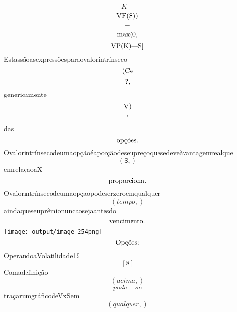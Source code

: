 \documentclass{article}
\begin{document}
\begin{equation}
K—
\end{equation}\begin{equation}
$VF(S))$
\end{equation}\begin{equation}
$=$
\end{equation}\begin{equation}
$max(0,$
\end{equation}\begin{equation}
$VP(K)—S]$
\end{equation}Estassãoasexpressõesparaovalorintrínseco\begin{equation}
$(Ce$
\end{equation}\begin{equation}
$?,$
\end{equation}genericamente\begin{equation}
$V)$
\end{equation}\begin{equation}
$'$
\end{equation}das\begin{equation}
$opções.$
\end{equation}Ovalorintrínsecodeumaopçãoéaporçãodeseupreçoquesedeveàvantagemrealque\begin{equation}
\left( \mathtt{\text{S}},\right)
\end{equation}emrelaçãoaX\begin{equation}
$proporciona.$
\end{equation}Ovalorintrínsecodeumaopçãopodeserzeroemqualquer\begin{equation}
\left( tempo,\right)
\end{equation}aindaqueseuprêmionuncaosejaantesdo\begin{equation}
$vencimento.$
\end{equation}\texttt{[image: output/image\_254png]}\begin{equation}
$Opções:$
\end{equation}OperandoaVolatilidade19\begin{equation}
\left[ 8\right]
\end{equation}Comadefinição\begin{equation}
\left( acima,\right)
\end{equation}\begin{equation}
pode - se
\end{equation}traçarumgráficodeVxSem\begin{equation}
\left( qualquer,\right)
\end{equation}\begin{equation}

\end{equation}
\end{document}

